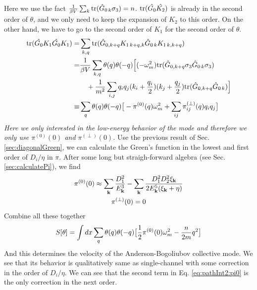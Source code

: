 Here we use the fact $\frac{1}{{\beta{}V}}\sum_{k}\text{tr}(\hat{G}_{0\,k}\sigma_3)=n$. $\text{tr}(\hat{G_{0}}\hat{K_2})$ is already in the second order of $\theta$, and we only need to keep the expansion of $K_2$ to this order. On the other hand, we have to go to the second order of $K_1$ for the second order of $\theta$. 
\begin{align}		
\text{tr}(\hat{G_{0}}{K_1}\hat{G_{0}}{K_1})=&\sum_{k,q}\text{tr}(\hat{G}_{0,k+q}K_{1\,k+q,k}\hat{G}_{0\,k}K_{1\,k,k+q})\\
=&\frac{1}{{\beta{}V}}\sum_{k,q}\theta(q)\theta(-q)\Big[(-\omega_m^2)\text{tr}(\hat{G}_{0,k+q}\sigma_3\hat{G}_{0\,k}\sigma_3)\nonumber\\
&\quad+\frac{1}{m^2}\sum_{i,j}q_iq_j(k_i+\frac{q_i}{2})(k_j+\frac{q_j}{2})\text{tr}(\hat{G}_{0,k+q}\hat{G}_{0\,k})\Big]\nonumber\\
\equiv&\sum_{q}\theta(q)\theta(-q)\big[-\pi^{(0)}(q)\omega_m^2+\sum_{ij}\pi^{(\perp)}_{ij}(q)q_iq_j\big]
\end{align}
\emph{Here we only interested in the low-energy behavior of the mode and therefore we only use $\pi^{(0)}(0)$ and $\pi^{(\perp)}(0)$.} Use the previous result of Sec. \ref{sec:diagonalGreen}, we can calculate the Green's function in the lowest and first order of $D_i/\eta$ in $\pi$.  After some long but straigh-forward algebra (see Sec. \ref{sec:calculatePi}), we find
\begin{gather}
\pi^{(0)}(0)\approx\sum_{\mathbf{k}}\frac{D_{1}^{2}}{E_{\mathbf{k}}^{3}}-\sum_{\mathbf{k}}\frac{D_{1}^{2}D_{2}^{2}\xi_{\mathbf{k}}}{2E_{\mathbf{k}}^{5}(\xi_{\mathbf{k}}+\eta)}
\label{eq:pathInt2:pi0}\\
\pi^{(\perp)}(0)=0
\end{gather}
Combine all these together
\begin{equation}
S[\theta]=\int{dx}\sum_{q}\theta(q)\theta(-q)\big[\frac{1}{2}\pi^{(0)}(0)\omega_m^2-\frac{n}{2m}q^2\big]
\end{equation}
And this determines the velocity of the Anderson-Bogoliubov collective mode.  We see that its behavior is qualitatively same as  single-channel with some correction in the order of $D_{i}/\eta$. We can see that  the second term in Eq. \eqref{eq:pathInt2:pi0} is
the only correction in the next order.


\begin{subappendices}

\end{subappendices}







